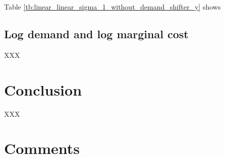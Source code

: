 \documentclass[11pt, a4paper]{article}
\begin{document}
Table \ref{tb:linear_linear_sigma_1_without_demand_shifter_y} shows


\subsection{Log demand and log marginal cost}

XXX

\section{Conclusion}

XXX

\newpage


\section{Comments}
\end{document}
